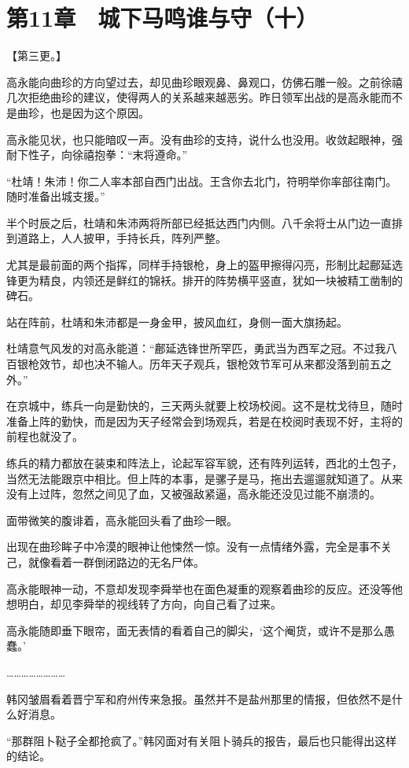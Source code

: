 \section{第11章　城下马鸣谁与守（十）}

【第三更。】

高永能向曲珍的方向望过去，却见曲珍眼观鼻、鼻观口，仿佛石雕一般。之前徐禧几次拒绝曲珍的建议，使得两人的关系越来越恶劣。昨日领军出战的是高永能而不是曲珍，也是因为这个原因。

高永能见状，也只能暗叹一声。没有曲珍的支持，说什么也没用。收敛起眼神，强耐下性子，向徐禧抱拳：“末将遵命。”

“杜靖！朱沛！你二人率本部自西门出战。王含你去北门，符明举你率部往南门。随时准备出城支援。”

半个时辰之后，杜靖和朱沛两将所部已经抵达西门内侧。八千余将士从门边一直排到道路上，人人披甲，手持长兵，阵列严整。

尤其是最前面的两个指挥，同样手持银枪，身上的盔甲擦得闪亮，形制比起鄜延选锋更为精良，内领还是鲜红的锦袄。排开的阵势横平竖直，犹如一块被精工凿制的碑石。

站在阵前，杜靖和朱沛都是一身金甲，披风血红，身侧一面大旗扬起。

杜靖意气风发的对高永能道：“鄜延选锋世所罕匹，勇武当为西军之冠。不过我八百银枪效节，却也决不输人。历年天子观兵，银枪效节军可从来都没落到前五之外。”

在京城中，练兵一向是勤快的，三天两头就要上校场校阅。这不是枕戈待旦，随时准备上阵的勤快，而是因为天子经常会到场观兵，若是在校阅时表现不好，主将的前程也就没了。

练兵的精力都放在装束和阵法上，论起军容军貌，还有阵列运转，西北的土包子，当然无法能跟京中相比。但上阵的本事，是骡子是马，拖出去遛遛就知道了。从来没有上过阵，忽然之间见了血，又被强敌紧逼，高永能还没见过能不崩溃的。

面带微笑的腹诽着，高永能回头看了曲珍一眼。

出现在曲珍眸子中冷漠的眼神让他悚然一惊。没有一点情绪外露，完全是事不关己，就像看着一群倒闭路边的无名尸体。

高永能眼神一动，不意却发现李舜举也在面色凝重的观察着曲珍的反应。还没等他想明白，却见李舜举的视线转了方向，向自己看了过来。

高永能随即垂下眼帘，面无表情的看着自己的脚尖，‘这个阉货，或许不是那么愚蠢。’

……………………

韩冈皱眉看着晋宁军和府州传来急报。虽然并不是盐州那里的情报，但依然不是什么好消息。

“那群阻卜鞑子全都抢疯了。”韩冈面对有关阻卜骑兵的报告，最后也只能得出这样的结论。

